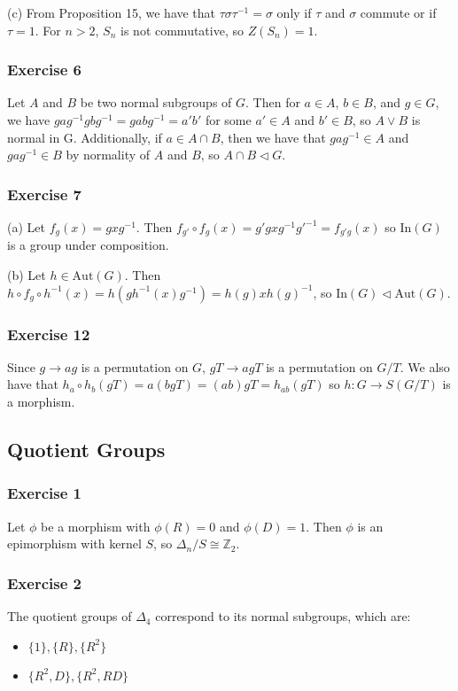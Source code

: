 (c) From Proposition 15, we have that $\tau \sigma \tau^{-1} = \sigma$ only if $\tau$ and $\sigma$ commute or
if $\tau = 1$. For $n > 2$, $S_n$ is not commutative, so $Z(S_n) = 1$.

\subsubsection{Exercise 6}
Let $A$ and $B$ be two normal subgroups of $G$. Then for $a \in A$, $b \in B$, and $g \in G$, we have
$g a g^{-1} g b g^{-1} = g a b g^{-1} = a' b'$ for some $a' \in A$ and $b' \in B$, so $A \vee B$ is
normal in G. Additionally, if $a \in A \cap B$, then we have that $g a g^{-1} \in A$ and
$g a g^{-1} \in B$ by normality of $A$ and $B$, so $A \cap B \triangleleft G$.

\subsubsection{Exercise 7}
(a) Let $f_{g}(x) = gxg^{-1}$. Then $f_{g'} \circ f_{g} (x) = g' g x g^{-1} g'^{-1} = f_{g' g} (x)$ so
$\text{In} (G)$ is a group under composition.

(b) Let $h \in \text{Aut}(G)$. Then $h \circ f_g \circ h^{-1} (x) = h(gh^{-1}(x)g^{-1}) = h(g) x h(g)^{-1}$,
so $\text{In} (G) \triangleleft \text{Aut} (G)$.

\subsubsection{Exercise 12}
Since $g \to ag$ is a permutation on $G$, $gT \to agT$ is a permutation on $G / T$. We also have that
$h_a \circ h_b (gT) = a (bg T) = (ab)g T = h_{ab} (gT)$ so $h: G \to S(G / T)$ is a morphism. 

\subsection{Quotient Groups}

\subsubsection{Exercise 1}
Let $\phi$ be a morphism with $\phi(R) = 0$ and $\phi(D) = 1$. Then $\phi$ is an epimorphism with kernel
$S$, so $\Delta_n / S \cong \mathbb{Z}_2$.

\subsubsection{Exercise 2}
The quotient groups of $\Delta_4$ correspond to its normal subgroups, which are:
\begin{itemize}
        \item $\{1\}, \{R\}, \{R^2\}$
        \item  $\{R^2, D\}, \{R^2, RD\}$
\end{itemize}


